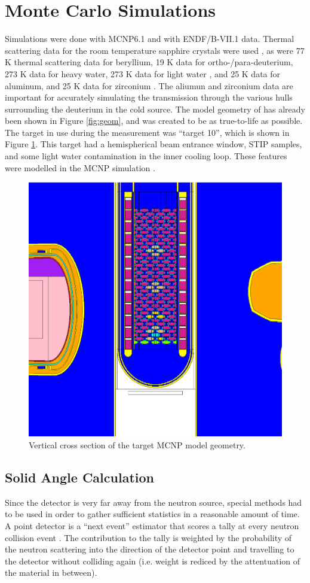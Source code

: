 \documentclass[5p,12pt]{elsarticle}
\begin{document}
\section{Monte Carlo Simulations}
\label{sec:sim}

Simulations were done with MCNP6.1 and with ENDF/B-VII.1 data.  Thermal scattering data for the room temperature sapphire crystals were used \cite{sapp}, as were 77 K thermal scattering data for beryllium, 19 K data for ortho-/para-deuterium, 273 K data for heavy water, 273 K data for light water \cite{mcnp6}, and 25 K data for aluminum, and 25 K data for zirconium \cite{IKE}.  The aliumun and zirconium data are important for accurately simulating the transmission through the various hulls surrounding the deuterium in the cold source.  The model geometry of has already been shown in Figure \ref{fig:geom}, and was created to be as true-to-life as possible.  The target in use during the measurement was ``target 10'', which is shown in Figure \ref{fig:target}. This target had a hemispherical beam entrance window, STIP samples, and some light water contamination in the inner cooling loop.  These features were modelled in the MCNP simulation \cite{target10}.

\begin{figure}[h!] 
  \centering
    \includegraphics[width=0.25\columnwidth,trim={5cm 3cm 5cm 0},clip]{graphics/target.eps}
     \caption{Vertical cross section of the target MCNP model geometry. \label{fig:target}}
\end{figure}

%
%
%
%
%

\subsection{Solid Angle Calculation}
\label{subsec:solidangle}

Since the detector is very far away from the neutron source, special methods had to be used in order to gather sufficient statistics in a reasonable amount of time.  A point detector is a ``next event'' estimator that scores a tally at every neutron collision event \cite{mcnp}.  The contribution to the tally is weighted by the probability of the neutron scattering into the direction of the detector point and travelling to the detector without colliding again (i.e. weight is rediced by the attentuation of the material in between).  
\end{document}
